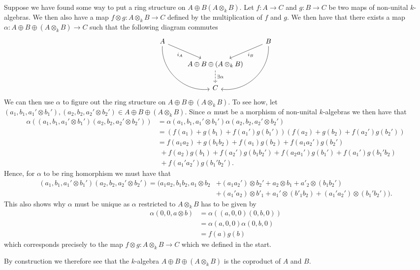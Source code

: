 \documentclass[a4paper]{article}
\begin{document}
\begin{exercise}{3}
Suppose we have found some way to put a ring structure on $ A \oplus B (A \otimes_k B) $. Let $ f: A \to C $ and $ g: B \to C $ be two maps of non-unital $ k $-algebras. We then also have a map $ f \otimes g: A \otimes_k B \to C $ defined by the multiplication of $ f $ and $ g $. We then have that there exists a map $ \alpha: A \oplus B \oplus (A \otimes_k B) \to C $ such that the following diagram commutes
\[\begin{tikzcd}
	A && B \\
	& {A \oplus B \oplus (A\otimes_k B)} \\
	& C
	\arrow["{i_B}", from=1-3, to=2-2]
	\arrow["{i_A}"', from=1-1, to=2-2]
	\arrow["{\exists\alpha}", dashed, from=2-2, to=3-2]
	\arrow[bend left=50, from=1-3, to=3-2]
	\arrow[bend right=50, from=1-1, to=3-2]
\end{tikzcd}\]
We can then use $ \alpha $ to figure out the ring structure on $ A \oplus B \oplus (A \otimes_k B) $. To see how, let $ (a_1, b_1, a_1' \otimes b_1'), (a_2, b_2, a_2' \otimes b_2') \in A \oplus B \oplus (A \otimes_k B) $. Since $ \alpha $ must be a morphism of non-unital $ k $-algebras we then have that
\begin{align*}
  \alpha( (a_1, b_1, a_1' \otimes b_1')(a_2, b_2, a_2' \otimes b_2') ) &= \alpha(a_1, b_1, a_1' \otimes b_1') \alpha(a_2, b_2, a_2' \otimes b_2') \\
                                                                       &= (f(a_1) + g(b_1) + f(a_1')g(b_1'))(f(a_2) + g(b_2) + f(a_2')g(b_2')) \\
                                                                       &= f(a_1 a_2) + g(b_1 b_2)
  +f(a_1)g(b_2) + f(a_1a_2')g(b_2')\\ &\,\,+ f(a_2)g(b_1) + f(a_2')g(b_1b_2') + f(a_2a_1')g(b_1') + f(a_1')g(b_1'b_2)\\
                                      &\,\,+ f(a_1'a_2')g(b_1'b_2')
.\end{align*}
Hence, for $ \alpha $ to be ring homorphism we must have that
\begin{align*}
  (a_1, b_1, a_1'\otimes b_1')(a_2, b_2, a_2'\otimes b_2') = (a_1a_2, b_1b_2, a_1 \otimes b_2 &+ (a_1a_2')\otimes b_2' + a_2 \otimes b_1 + a'_2 \otimes (b_1b_2') \\  &+ (a_1'a_2) \otimes b'_1 + a_1'\otimes (b'_1b_2) + (a_1'a_2') \otimes (b_1' b_2'))
.\end{align*}
This also shows why $ \alpha $ must be unique as $ \alpha $ restricted to $ A \otimes_k B $ has to be given by
\begin{align*}
  \alpha(0, 0, a \otimes b) &= \alpha((a, 0, 0)(0,b,0)) \\
                            &= \alpha(a,0,0)\alpha(0,b,0) \\
                            &= f(a)g(b)
\end{align*}
which corresponds precisely to the map $ f \otimes g: A \otimes_k B \to C $ which we defined in the start.

By construction we therefore see that the $ k $-algebra $ A \oplus B \oplus (A \otimes_k B) $ is the coproduct of $ A $ and $ B $.
\end{exercise}
\end{document}

